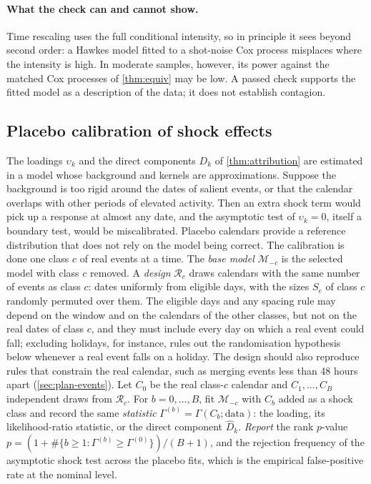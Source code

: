 \paragraph{What the check can and cannot show.} Time rescaling uses the full conditional
intensity, so in principle it sees beyond second order: a Hawkes model fitted to a
shot-noise Cox process misplaces where the intensity is high. In moderate samples,
however, its power against the matched Cox processes of \cref{thm:equiv} may be low. A
passed check supports the fitted model as a description of the data; it does not
establish contagion.

\subsection{Placebo calibration of shock effects}\label{sec:est-placebo}

The loadings $\upsilon_k$ and the direct components $D_k$ of \cref{thm:attribution} are
estimated in a model whose background and kernels are approximations. Suppose the
background is too rigid around the dates of salient events, or that the calendar overlaps
with other periods of elevated activity. Then an extra shock term would pick up a response
at almost any date, and the asymptotic test of $\upsilon_k=0$, itself a boundary test, would
be miscalibrated. Placebo calendars provide a reference distribution that does not rely on
the model being correct. The calibration is done one class $c$ of real events at a time.
The \emph{base model} $\mathcal M_{-c}$ is the selected model with class $c$ removed. A
\emph{design} $\mathcal R_c$ draws calendars with the same number of events as class $c$:
dates uniformly from eligible days, with the sizes $S_e$ of class $c$ randomly permuted over
them. The eligible days and any spacing rule may depend on the window and on the calendars
of the other classes, but not on the real dates of class $c$, and they must include every
day on which a real event could fall; excluding holidays, for instance, rules out the
randomisation hypothesis below whenever a real event falls on a holiday. The design should
also reproduce rules that constrain the real calendar, such as merging events less than 48
hours apart (\cref{sec:plan-events}). Let $C_0$ be the real class-$c$ calendar and
$C_1,\dots,C_B$ independent draws from $\mathcal R_c$. For $b=0,\dots,B$, fit
$\mathcal M_{-c}$ with $C_b$ added as a shock class and record the same \emph{statistic}
$\Gamma^{(b)}=\Gamma(C_b;\text{data})$: the loading, its likelihood-ratio statistic, or the
direct component $\hat D_k$. \emph{Report} the rank $p$-value
$p=(1+\#\{b\ge1:\Gamma^{(b)}\ge\Gamma^{(0)}\})/(B+1)$, and the rejection frequency of the
asymptotic shock test across the placebo fits, which is the empirical false-positive rate
at the nominal level.

